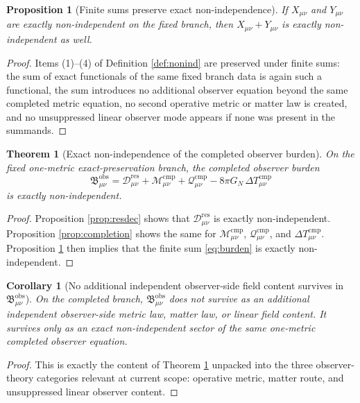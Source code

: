 \documentclass[11pt]{article}
\newcommand{\ResidualDec}{\mathcal D_{\mu\nu}^{\mathrm{res}}}
\newcommand{\CompMix}{\mathcal M_{\mu\nu}^{\mathrm{cmp}}}
\newcommand{\CompQuad}{\mathcal Q_{\mu\nu}^{\mathrm{cmp}}}
\newcommand{\DeltaTComp}{\Delta T_{\mu\nu}^{\mathrm{cmp}}}
\newcommand{\ObsBurden}{\mathfrak B_{\mu\nu}^{\mathrm{obs}}}
\newtheorem{proposition}{Proposition}
\newtheorem{corollary}{Corollary}
\newtheorem{theorem}{Theorem}
\begin{document}
\begin{proposition}[Finite sums preserve exact non-independence]
\label{prop:sum}
If \(X_{\mu\nu}\) and \(Y_{\mu\nu}\) are exactly non-independent on the fixed branch, then \(X_{\mu\nu}+Y_{\mu\nu}\) is exactly non-independent as well.
\end{proposition}

\begin{proof}
Items (1)--(4) of Definition \ref{def:nonind} are preserved under finite sums: the sum of exact functionals of the same fixed branch data is again such a functional, the sum introduces no additional observer equation beyond the same completed metric equation, no second operative metric or matter law is created, and no unsuppressed linear observer mode appears if none was present in the summands.
\end{proof}

\begin{theorem}[Exact non-independence of the completed observer burden]
\label{thm:burden}
On the fixed one-metric exact-preservation branch, the completed observer burden
\[
\ObsBurden
=
\ResidualDec+\CompMix+\CompQuad-8\pi G_N\,\DeltaTComp
\]
is exactly non-independent.
\end{theorem}

\begin{proof}
Proposition \ref{prop:resdec} shows that \(\ResidualDec\) is exactly non-independent. Proposition \ref{prop:completion} shows the same for \(\CompMix\), \(\CompQuad\), and \(\DeltaTComp\). Proposition \ref{prop:sum} then implies that the finite sum \eqref{eq:burden} is exactly non-independent.
\end{proof}

\begin{corollary}[No additional independent observer-side field content survives in \texorpdfstring{\(\ObsBurden\)}{ObsBurden}]
\label{cor:nophysics}
On the completed branch, \(\ObsBurden\) does not survive as an additional independent observer-side metric law, matter law, or linear field content. It survives only as an exact non-independent sector of the same one-metric completed observer equation.
\end{corollary}

\begin{proof}
This is exactly the content of Theorem \ref{thm:burden} unpacked into the three observer-theory categories relevant at current scope: operative metric, matter route, and unsuppressed linear observer content.
\end{proof}
\end{document}
